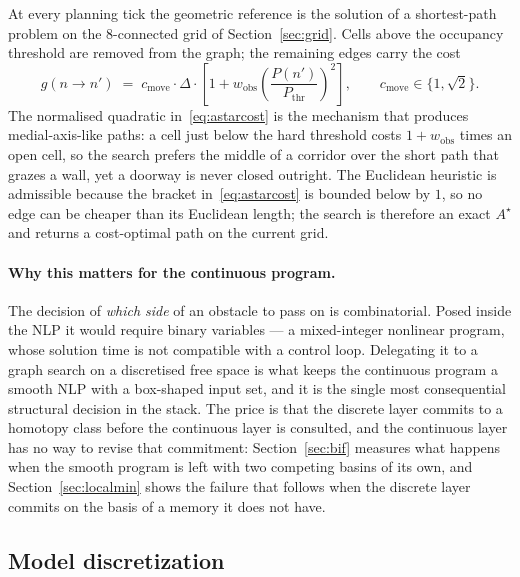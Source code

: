 \documentclass[11pt,a4paper]{article}
\newcommand{\astar}{$A^\star$}
\begin{document}
At every planning tick the geometric reference is the solution of a shortest-path problem on the
$8$-connected grid of Section~\ref{sec:grid}. Cells above the occupancy threshold are removed from the graph;
the remaining edges carry the cost
\begin{equation}
  g(n\rightarrow n') \;=\; c_{\mathrm{move}}\cdot\Delta\cdot
  \left[1+w_{\mathrm{obs}}\left(\frac{P(n')}{P_{\mathrm{thr}}}\right)^{\!2}\right],
  \qquad c_{\mathrm{move}}\in\{1,\sqrt2\}.
  \label{eq:astarcost}
\end{equation}
The normalised quadratic in~\eqref{eq:astarcost} is the mechanism that produces medial-axis-like paths: a
cell just below the hard threshold costs $1+w_{\mathrm{obs}}$ times an open cell, so the search prefers the
middle of a corridor over the short path that grazes a wall, yet a doorway is never closed outright. The
Euclidean heuristic is admissible because the bracket in~\eqref{eq:astarcost} is bounded below by $1$, so no
edge can be cheaper than its Euclidean length; the search is therefore an exact \astar{} and returns a
cost-optimal path on the current grid.

\paragraph{Why this matters for the continuous program.} The decision of \emph{which side} of an obstacle to
pass on is combinatorial. Posed inside the NLP it would require binary variables --- a mixed-integer
nonlinear program, whose solution time is not compatible with a control loop. Delegating it to a graph search
on a discretised free space is what keeps the continuous program a smooth NLP with a box-shaped input set,
and it is the single most consequential structural decision in the stack. The price is that the discrete
layer commits to a homotopy class before the continuous layer is consulted, and the continuous layer has no
way to revise that commitment: Section~\ref{sec:bif} measures what happens when the smooth program is left
with two competing basins of its own, and Section~\ref{sec:localmin} shows the failure that follows when the
discrete layer commits on the basis of a memory it does not have.

\subsection{Model discretization}
\label{sec:discretization}
\end{document}
